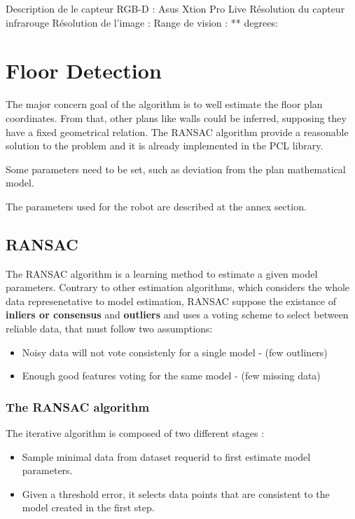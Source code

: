 Description de le capteur RGB-D :
Asus Xtion Pro Live
Résolution du capteur infrarouge
Résolution de l'image :
Range de vision : ** degrees:


\section { Floor Detection } 

The major concern goal of the algorithm is to well estimate the floor plan coordinates. From that, other plans like walls could be inferred, supposing they have a fixed geometrical relation. The RANSAC algorithm provide a reasonable solution to the problem and it is already implemented in the PCL library.

Some parameters need to be set, such as deviation from the plan mathematical model.

The parameters used for the robot are described at the annex section.

\subsection { RANSAC } 

The RANSAC algorithm is a learning method to estimate a given model parameters. Contrary to other estimation algorithms, which considers the whole data represenetative to model estimation, RANSAC suppose the existance of \textbf{inliers or consensus} and \textbf{outliers}  and uses a voting scheme to select between reliable data, that must follow two assumptions: 

\begin{itemize}
  \item Noisy data will not vote consistenly for a single model - (few outliners) 
  \item Enough good features voting for the same model - (few missing data)
\end{itemize}

\subsubsection{The RANSAC algorithm}

The iterative algorithm is composed of two different stages : 
\begin {itemize}
  \item Sample minimal data from dataset requerid to first estimate model parameters.
  \item Given a threshold error, it selects data points that are consistent to the model created in the first step.
\end {itemize}

